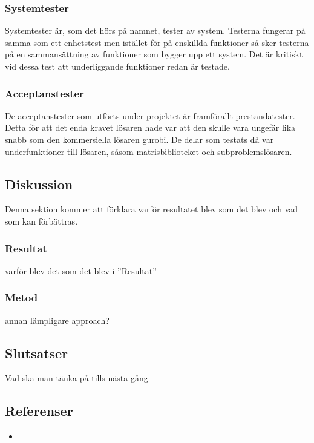 	\subsubsection{Systemtester}
	Systemtester är, som det hörs på namnet, tester av system. Testerna fungerar på samma som ett enhetstest men istället för på enskillda funktioner så sker testerna på en sammansättning av funktioner som bygger upp ett system. Det är kritiskt vid dessa test att underliggande funktioner redan är testade.
	\subsubsection{Acceptanstester}
	De acceptanstester som utförts under projektet är framförallt prestandatester. Detta för att det enda kravet lösaren hade var att den skulle vara ungefär lika snabb som den kommersiella lösaren gurobi. De delar som testats då var underfunktioner till lösaren, såsom matrisbiblioteket och subproblemslösaren.
	
	\subsection{Diskussion}
	Denna sektion kommer att förklara varför resultatet blev som det blev och vad som kan förbättras.	
	
	\subsubsection{Resultat}
	varför blev det som det blev i ''Resultat''
	
	\subsubsection{Metod}
	annan lämpligare approach?	
	
	\subsection{Slutsatser}
	Vad ska man tänka på tills nästa gång
	
	\subsection{Referenser}
	\begin{itemize}
	\item{}
	\end{itemize}
